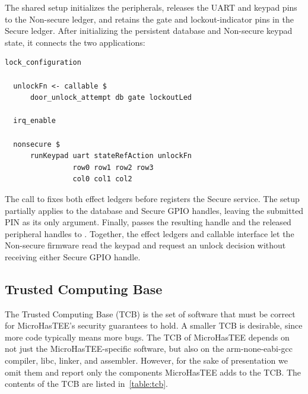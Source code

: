 \documentclass[sigconf]{acmart}
\begin{document}
The shared setup initializes the peripherals, releases the UART and keypad pins to the Non-secure ledger, and retains the gate and lockout-indicator pins in the Secure ledger.
After initializing the persistent database and Non-secure keypad state, it connects the two applications:

\begin{lstlisting}[style=haskell]
  lock_configuration

  unlockFn <- callable $
      door_unlock_attempt db gate lockoutLed

  irq_enable

  nonsecure $
      runKeypad uart stateRefAction unlockFn
                row0 row1 row2 row3
                col0 col1 col2
\end{lstlisting}

The call to  fixes both effect ledgers before  registers the Secure service.
The setup partially applies  to the database and Secure GPIO handles, leaving the submitted PIN as its only argument.
Finally,  passes the resulting handle and the released peripheral handles to .
Together, the effect ledgers and callable interface let the Non-secure firmware read the keypad and request an unlock decision without receiving either Secure GPIO handle.

\subsection{Trusted Computing Base}

The Trusted Computing Base (TCB) is the set of software that must be correct for MicroHasTEE's security guarantees to hold.
A smaller TCB is desirable, since more code typically means more bugs.
The TCB of MicroHasTEE depends on not just the MicroHasTEE-specific software, but also on the arm-none-eabi-gcc compiler, libc, linker, and assembler.
However, for the sake of presentation we omit them and report only the components MicroHasTEE adds to the TCB.
The contents of the TCB are listed in~\cref{table:tcb}.
\end{document}
